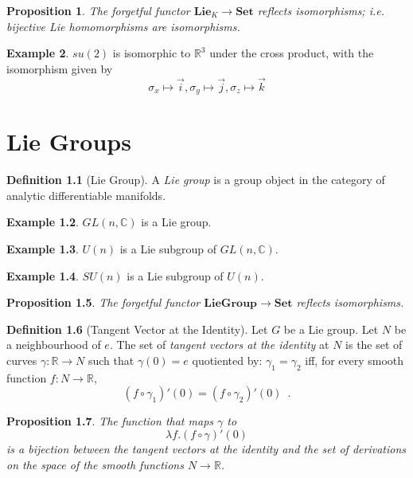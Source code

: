 \documentclass{book}
\newtheorem{prop}{Proposition}[chapter]
\theoremstyle{definition}
\newtheorem{df}[prop]{Definition}
\newtheorem{ex}[prop]{Example}
\newcommand{\Set}{\ensuremath{\mathbf{Set}}}
\begin{document}
\begin{prop}
The forgetful functor $\mathbf{Lie}_K \rightarrow \Set$ reflects isomorphisms; i.e. bijective Lie homomorphisms are isomorphisms.
\end{prop}


\begin{ex}
$su(2)$ is isomorphic to $\mathbb{R}^3$ under the cross product, with the isomorphism given by
\[ \sigma_x \mapsto \vec{i}, \sigma_y \mapsto \vec{j}, \sigma_z \mapsto \vec{k} \]
\end{ex}

\chapter{Lie Groups}

\begin{df}[Lie Group]
A \emph{Lie group} is a group object in the category of analytic differentiable manifolds.
\end{df}

\begin{ex}
$GL(n,\mathbb{C})$ is a Lie group.
\end{ex}

\begin{ex}
$U(n)$ is a Lie subgroup of $GL(n,\mathbb{C})$.
\end{ex}

\begin{ex}
$SU(n)$ is a Lie subgroup of $U(n)$.
\end{ex}

\begin{prop}
The forgetful functor $\mathbf{LieGroup} \rightarrow \Set$ reflects isomorphisms.
\end{prop}


\begin{df}[Tangent Vector at the Identity]
Let $G$ be a Lie group. Let $N$ be a neighbourhood of $e$. The set of \emph{tangent vectors at the identity} at $N$ is the set of curves $\gamma : \mathbb{R} \rightarrow N$ such that $\gamma(0) = e$ quotiented by: $\gamma_1 = \gamma_2$ iff, for every smooth function $f : N \rightarrow \mathbb{R}$,
\[ (f \circ \gamma_1)'(0) = (f \circ \gamma_2)'(0) \enspace . \]
\end{df}

\begin{prop}
The function that maps $\gamma$ to
\[ \lambda f. (f \circ \gamma)'(0) \]
 is a bijection between the tangent vectors at the identity and the set of derivations on the space of the smooth functions $N \rightarrow \mathbb{R}$.
 \end{prop}
 
\end{document}
